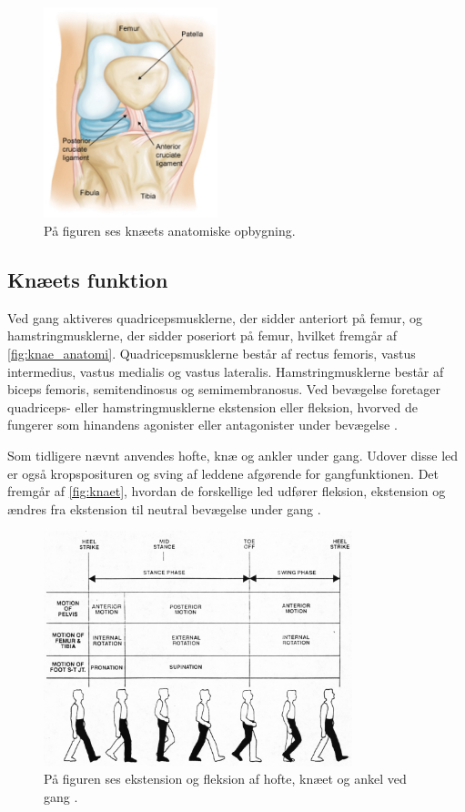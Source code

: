 \begin{figure}[H]
\centering
\includegraphics[width=0.45\textwidth]{figures/knae_anatomi}
\caption{På figuren ses knæets anatomiske opbygning.}%
\label{fig:knae_anatomi}
\end{figure} 

\subsection{Knæets funktion}
Ved gang aktiveres quadricepsmusklerne, der sidder anteriort på femur, og hamstringmusklerne, der sidder poseriort på femur, hvilket fremgår af \autoref{fig:knae_anatomi}. Quadricepsmusklerne består af rectus femoris, vastus intermedius, vastus medialis og vastus lateralis. Hamstringmusklerne består af biceps femoris, semitendinosus og semimembranosus. Ved bevægelse foretager quadriceps- eller hamstringmusklerne ekstension eller fleksion, hvorved de fungerer som hinandens agonister eller antagonister under bevægelse \citep{martini2012}. 

Som tidligere nævnt anvendes hofte, knæ og ankler under gang. Udover disse led er også kropsposituren og sving af leddene afgørende for gangfunktionen. Det fremgår af \autoref{fig:knaet}, hvordan de forskellige led udfører fleksion, ekstension og ændres fra ekstension til neutral bevægelse under gang \citep{martini2012}.

\begin{figure} [H]
\centering
\includegraphics[width=0.8\textwidth]{figures/knaet}
\caption{På figuren ses ekstension og fleksion af hofte, knæet og ankel ved gang \citep{orthopedics2016}.}
\label{fig:knaet}
\end{figure} 

